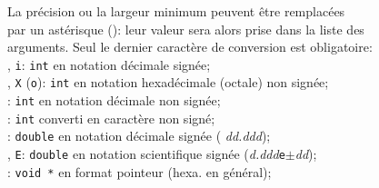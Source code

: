\begin{frame}
  \newpage
  La pr\'ecision ou la largeur minimum peuvent \^etre remplac\'ees\\
  par un ast\'erisque ({\tt *}): leur valeur sera alors prise dans la liste des \\
  arguments. Seul le dernier caract\`ere de conversion est obligatoire:\\
  \hspace*{5mm}{\tt d}, {\tt i}: {\tt int} en notation d\'ecimale sign\'ee;\\
  \hspace*{5mm}{\tt x}, {\tt X} ({\tt o}): {\tt int} en notation
  hexad\'ecimale (octale) non sign\'ee;\\
  \hspace*{5mm}{\tt u}: {\tt int} en notation d\'ecimale non sign\'ee;\\
  \hspace*{5mm}{\tt c}: {\tt int} converti en caract\`ere non sign\'e;\\
  \hspace*{5mm}{\tt f}: {\tt double} en notation d\'ecimale sign\'ee
  ({\it
    dd.ddd});\\
  \hspace*{5mm}{\tt e}, {\tt E}: {\tt double} en notation scientifique
  sign\'ee ({\it d.ddd}{\tt e$\pm$}{\it dd});\\
  \hspace*{5mm}{\tt p}: {\tt void *} en format pointeur (hexa. en g\'en\'eral);\\


\end{frame}


